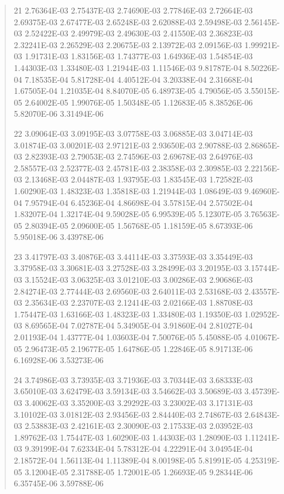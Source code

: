\documentclass[letterpaper,10pt,english]{sphinxmanual}
\begin{document}
\begin{quote}
\begin{DUlineblock}{0em}
\item[] 21   2.76364E-03  2.75437E-03  2.74690E-03  2.77846E-03  2.72664E-03  2.69375E-03  2.67477E-03  2.65248E-03  2.62088E-03  2.59498E-03  2.56145E-03  2.52422E-03  2.49979E-03  2.49630E-03  2.41550E-03  2.36823E-03  2.32241E-03  2.26529E-03  2.20675E-03  2.13972E-03  2.09156E-03  1.99921E-03  1.91731E-03  1.83156E-03  1.74377E-03  1.64936E-03  1.54854E-03  1.44303E-03  1.33480E-03  1.21944E-03  1.11546E-03  9.81787E-04  8.50226E-04  7.18535E-04  5.81728E-04  4.40512E-04  3.20338E-04  2.31668E-04  1.67505E-04  1.21035E-04  8.84070E-05  6.48973E-05  4.79056E-05  3.55015E-05  2.64002E-05  1.99076E-05  1.50348E-05  1.12683E-05  8.38526E-06  5.82070E-06  3.31494E-06
\item[] 22   3.09064E-03  3.09195E-03  3.07758E-03  3.06885E-03  3.04714E-03  3.01874E-03  3.00201E-03  2.97121E-03  2.93650E-03  2.90788E-03  2.86865E-03  2.82393E-03  2.79053E-03  2.74596E-03  2.69678E-03  2.64976E-03  2.58557E-03  2.52377E-03  2.45781E-03  2.38358E-03  2.30985E-03  2.22156E-03  2.13468E-03  2.04487E-03  1.93795E-03  1.83545E-03  1.72582E-03  1.60290E-03  1.48323E-03  1.35818E-03  1.21944E-03  1.08649E-03  9.46960E-04  7.95794E-04  6.45236E-04  4.86698E-04  3.57815E-04  2.57502E-04  1.83207E-04  1.32174E-04  9.59028E-05  6.99539E-05  5.12307E-05  3.76563E-05  2.80394E-05  2.09600E-05  1.56768E-05  1.18159E-05  8.67393E-06  5.95018E-06  3.43978E-06
\item[] 23   3.41797E-03  3.40876E-03  3.44114E-03  3.37593E-03  3.35449E-03  3.37958E-03  3.30681E-03  3.27528E-03  3.28499E-03  3.20195E-03  3.15744E-03  3.15524E-03  3.06325E-03  3.01210E-03  3.00286E-03  2.90686E-03  2.84274E-03  2.77444E-03  2.69560E-03  2.64011E-03  2.53168E-03  2.43557E-03  2.35634E-03  2.23707E-03  2.12414E-03  2.02166E-03  1.88708E-03  1.75447E-03  1.63166E-03  1.48323E-03  1.33480E-03  1.19350E-03  1.02952E-03  8.69565E-04  7.02787E-04  5.34905E-04  3.91860E-04  2.81027E-04  2.01193E-04  1.43777E-04  1.03603E-04  7.50076E-05  5.45088E-05  4.01067E-05  2.96473E-05  2.19677E-05  1.64786E-05  1.22846E-05  8.91713E-06  6.16928E-06  3.53273E-06
\item[] 24   3.74986E-03  3.73935E-03  3.71936E-03  3.70344E-03  3.68333E-03  3.65010E-03  3.62479E-03  3.59134E-03  3.54662E-03  3.50689E-03  3.45739E-03  3.40062E-03  3.35200E-03  3.29292E-03  3.23002E-03  3.17131E-03  3.10102E-03  3.01812E-03  2.93456E-03  2.84440E-03  2.74867E-03  2.64843E-03  2.53883E-03  2.42161E-03  2.30090E-03  2.17533E-03  2.03952E-03  1.89762E-03  1.75447E-03  1.60290E-03  1.44303E-03  1.28090E-03  1.11241E-03  9.39199E-04  7.62334E-04  5.78312E-04  4.22291E-04  3.04954E-04  2.18572E-04  1.56113E-04  1.11389E-04  8.00198E-05  5.81991E-05  4.25319E-05  3.12004E-05  2.31788E-05  1.72001E-05  1.26693E-05  9.28344E-06  6.35745E-06  3.59788E-06

\end{DUlineblock}
\end{quote}
\end{document}
